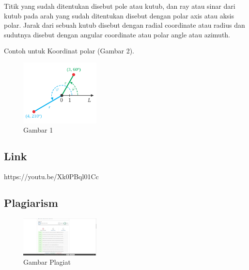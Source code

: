 \begin{itemize}
\begin{enumerate}
Titik yang sudah ditentukan disebut pole atau kutub, dan ray atau sinar dari kutub pada arah yang sudah ditentukan disebut dengan polar axis atau aksis polar. Jarak dari sebuah kutub disebut dengan radial coordinate atau radius dan sudutnya disebut dengan angular coordinate atau polar angle atau azimuth.

Contoh untuk Koordinat polar (Gambar 2).
	\begin{figure}[H]
	\includegraphics[width=4cm]{figures/Tugas1/1174066/polar.png}
	\centering
	\caption{Gambar 1}
\end{figure}
	\end{enumerate}
\end{itemize}
\subsection{Link}
https://youtu.be/Xk0PBql01Cc
\subsection{Plagiarism}
\begin{figure}[H]
	\includegraphics[width=4cm]{figures/Tugas1/1174066/plagiat.jpg}
	\centering
	\caption{Gambar Plagiat}
\end{figure}